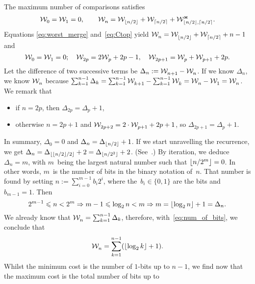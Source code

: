 The maximum number of comparisons satisfies
\begin{equation*}
\mathcal{W}_{0}^{} = \mathcal{W}_{1}^{} = 0,
\qquad
\mathcal{W}_{n}^{} = \mathcal{W}_{\lfloor{n/2}\rfloor}^{}
+ \mathcal{W}_{\lceil{n/2}\rceil}^{}
+ \mathcal{W}_{\lfloor{n/2}\rfloor,\lceil{n/2}\rceil}^{\Join}.
\end{equation*}
Equations \eqref{eq:worst_merge} and~\eqref{eq:Ctop} yield
\(\mathcal{W}_{n}^{} = \mathcal{W}_{\lfloor{n/2}\rfloor}^{} +
\mathcal{W}_{\lceil{n/2}\rceil}^{} + n - 1\) and
\begin{equation*}
\mathcal{W}_{0}^{} = \mathcal{W}_{1}^{} = 0;\quad
\mathcal{W}_{2p}^{} = 2\mathcal{W}_{p}^{} + 2p - 1,\quad
\mathcal{W}_{2p+1}^{} = \mathcal{W}_{p}^{} + \mathcal{W}_{p+1}^{} + 2p.
\end{equation*}
Let the difference of two successive terms be \(\Delta_n :=
\smash[t]{\mathcal{W}_{n+1}^{}} - \mathcal{W}_{n}^{}\). If we know \(\Delta_n\), we know
\(\mathcal{W}_{n}^{}\) because \(\sum_{k=1}^{n-1}\Delta_k =
\sum_{k=1}^{n-1}\mathcal{W}_{k+1}^{} - \sum_{k=1}^{n-1}\mathcal{W}_{k}^{} = \mathcal{W}_{n}^{} -
\mathcal{W}_{1}^{} = \mathcal{W}_{n}^{}\). We remark that
\begin{itemize}

  \item if \(n=2p\), then \(\Delta_{2p} = \Delta_{p} + 1\),

  \item otherwise \(n=2p+1\) and \(\mathcal{W}_{2p+2}^{} = 2 \cdot \mathcal{W}_{p+1}^{} + 2p
    + 1\), so \(\Delta_{2p+1} = \Delta_{p} + 1\).

\end{itemize}
In summary, \(\Delta_0 = 0\) and \(\Delta_n = \Delta_{\lfloor{n/2}\rfloor} +
1\). If we start unravelling the recurrence, we get \(\Delta_n =
\Delta_{\lfloor{\lfloor{n/2}\rfloor/2}\rfloor} + 2 = \Delta_{\lfloor{n/2^2}\rfloor} +
2\). (See~\cite[Exercise 1.2.4.35]{Knuth:1997}.)  By iteration, we
deduce \(\Delta_n = m\), with \(m\)~being the largest natural number
such that \(\lfloor{n/2^m}\rfloor = 0\). In other words, \(m\)~is the number
of bits in the binary notation of~\(n\). That number is found by
setting \(n := \sum_{i=0}^{m-1}{b_i2^i}\), where the~\(b_i \in
\{0,1\}\) are the bits and \(b_{m-1}=1\). Then
\begin{equation}
2^{m-1} \leqslant n < 2^m \Rightarrow m - 1 \leqslant \log_2 n
< m \Rightarrow m = \lfloor{\log_2 n}\rfloor + 1 = \Delta_n.
\label{eq:num_of_bits}
\end{equation}
We already know that \(\mathcal{W}_{n}^{} = \sum_{k=1}^{n-1}\Delta_k\),
therefore, with~\eqref{eq:num_of_bits}, we conclude that
\begin{equation}
\mathcal{W}_{n}^{} = \sum_{k=1}^{n-1}(\lfloor{\log_2 k}\rfloor+1).
\label{eq:tms_n_tmp}
\end{equation}
Whilst the minimum cost is the number of \(1\)-bits up to \(n-1\), we
find now that the maximum cost is the total number of bits up to
